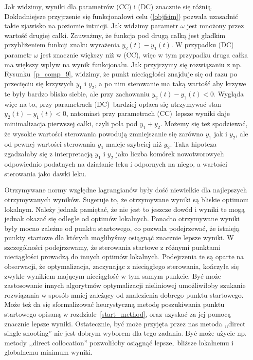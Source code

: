 \documentclass[licencjacka]{pracamgr}
\begin{document}
Jak widzimy, wyniki dla parametrów (CC) i (DC) znacznie się różnią. Dokładniejsze przyjrzenie się funkcjonałowi celu (\ref{objfsim}) pozwala uzasadnić takie zjawisko na poziomie intuicji. Jak widzimy parametr $\omega$ jest mnożony przez wartość drugiej całki. Zauważmy, że funkcja pod drugą całką jest gładkim przybliżeniem funkcji znaku wyrażenia $y_2(t) - y_1(t)$. W przypadku (DC) parametr $\omega$ jest znacznie większy niż w (CC), więc w tym przypadku druga całka ma większy wpływ na wynik funkcjonału. Jak przyjrzymy się rozwiązaniu z np. Rysunku~\ref{p_comp_9}, widzimy, że punkt nieciągłości znajduje się od razu po przecięciu się krzywych $y_1$ i $y_2$, a po nim sterowanie ma taką wartość aby krzywe te były bardzo blisko siebie, ale przy zachowaniu $y_2(t) - y_1(t) < 0$. Wygląda więc na to, przy parametrach (DC)\ bardziej opłaca się utrzymywać stan $y_2(t) - y_1(t) < 0$, natomiast przy parametrach (CC)\ lepsze wyniki daje minimalizacja pierwszej całki, czyli pola pod $y_1 + y_2$. Możemy się też spodziewać, że wysokie wartości sterowania powodują zmniejszanie się zarówno $y_1$ jak i $y_2$, ale od pewnej wartości sterowania $y_1$ maleje szybciej niż $y_2$. Taka hipoteza zgadzałaby się z interpretacją $y_1$ i $y_2$ jako liczba komórek nowotworowych odpowiednio podatnych na działanie leku i odpornych na niego, a wartości sterowania jako dawki leku.

Otrzymywane normy względne lagrangianów były dość niewielkie dla najlepszych otrzymywanych wyników. Sugeruje to, że otrzymywane wyniki są bliskie optimom lokalnym. Należy jednak pamiętać, że nie jest to jeszcze dowód i wyniki te mogą jednak okazać się odległe od optimów lokalnych. Ponadto otrzymywane wyniki były mocno zależne od punktu startowego, co pozwala podejrzewać, że istnieją punkty startowe dla których moglibyśmy osiągnąć znacznie lepsze wyniki. W szczególności podejrzewamy, że sterowania startowe z różnymi punktami nieciągłości prowadzą do innych optimów lokalnych. Podejrzenia te są oparte na obserwacji, że optymalizacja, zaczynając z nieciągłego sterowania, kończyła się zwykle wynikiem mającym nieciągłość w tym samym punkcie. Być może zastosowanie innych algorytmów optymalizacji nieliniowej umożliwiłoby szukanie rozwiązania w sposób mniej zależący od znalezienia dobrego punktu startowego. Może też da się sformalizować heurystyczną metodę poszukiwania punktu startowego opisaną w rozdziale~\ref{start_method}, oraz uzyskać za jej pomocą znacznie lepsze wyniki. Ostatecznie, być może przyjęta przez nas metoda ,,direct single shooting'' nie jest dobrym wyborem dla tego zadania. Być może użycie np. metody ,,direct collocation'' pozwoliłoby osiągnąć lepsze,\ bliższe lokalnemu i globalnemu minimum wyniki.
\end{document}
